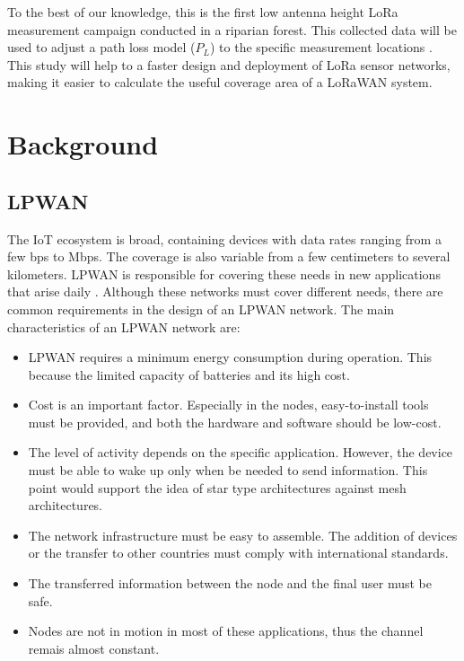 To the best of our knowledge, this is the first low antenna height LoRa measurement campaign conducted in a riparian forest. This collected data will be used to adjust a path loss model ($P_L$) to the specific measurement locations \cite{Mikhaylov2016}. This study will help to a faster design and deployment of LoRa sensor networks, making it easier to calculate the useful coverage area of a LoRaWAN system.


\section{Background}

\subsection{LPWAN} 
\label{sec:LPWAN}

The IoT ecosystem is broad, containing devices with data rates ranging from a few bps to Mbps. The coverage is also variable from a few centimeters to several kilometers. LPWAN is responsible for covering these needs in new applications that arise daily \cite{Bardyn2016}. Although these networks must cover different needs, there are common requirements in the design of an LPWAN network. The main characteristics of an LPWAN network are:


\begin{itemize}
\item LPWAN requires a minimum energy consumption during operation. This because the limited capacity of batteries and its high cost.
\item Cost is an important factor. Especially in the nodes, easy-to-install tools must be provided, and both the hardware and software should be low-cost.
\item The level of activity depends on the specific application. However, the device must be able to wake up only when be needed to send information. This point would support the idea of star type architectures against mesh architectures.
\item The network infrastructure must be easy to assemble. The addition of devices or the transfer to other countries must comply with international standards.
\item The transferred information between the node and the final user must be safe.
\item Nodes are not in motion in most of these applications, thus the channel remais almost constant. 

\end{itemize}

